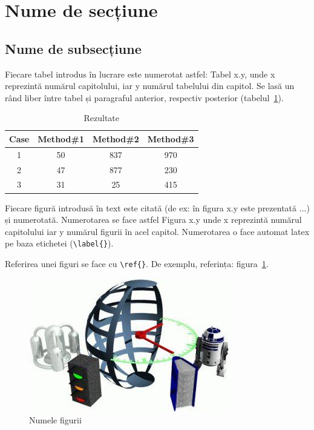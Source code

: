 \section{Nume de secțiune}\label{sec:context}

\subsection{Nume de subsecțiune}\label{subsec:numesub}

Fiecare tabel introdus în lucrare este numerotat astfel: Tabel x.y, unde x reprezintă numărul capitolului, iar y numărul tabelului din capitol.
Se lasă un rând liber între tabel și paragraful anterior, respectiv posterior (tabelul~\ref{tab:nonlin}).

\begin{table}[ht]
    \caption{Rezultate}
    \centering                          %
    \begin{tabular}{|c|c|c|c|}          %
        \hline
        Case & Method\#1 & Method\#2 & Method\#3 \\ [0.5ex]   %
        \hline                              %
        1 & 50 & 837 & 970 \\               %
        2 & 47 & 877 & 230 \\
        3 & 31 & 25 & 415 \\[1ex]           %
        \hline
    \end{tabular}
    \label{tab:nonlin}                %
\end{table}


Fiecare figură introdusă în text este citată (de ex: în figura x.y este prezentată ...) și numerotată.
Numerotarea se face astfel Figura x.y unde x reprezintă numărul capitolului iar y numărul figurii în acel capitol.
Numerotarea o face automat latex pe baza etichetei (\verb+\label{}+).

Referirea unei figuri se face cu \verb+\ref{}+. De exemplu, referința: figura~\ref{fig:imag}.

\begin{figure}[ht]
    \centering
    \includegraphics[]{figs/test.jpg}
    \caption{Numele figurii}
    \label{fig:imag}
\end{figure}

